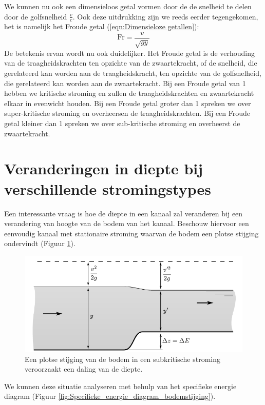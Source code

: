 We kunnen nu ook een dimensieloos getal vormen door de de snelheid te delen door de golfsnelheid $\frac{v}{c}$. Ook deze uitdrukking zijn we reeds eerder tegengekomen, het is namelijk het Froude getal (\ref{eqn:Dimensieloze getallen}):
\begin{equation}
	\text{Fr} = \dfrac{v}{\sqrt{g y}}
\end{equation}
De betekenis ervan wordt nu ook duidelijker. Het Froude getal is de verhouding van de traagheidskrachten ten opzichte van de zwaartekracht, of de snelheid, die gerelateerd kan worden aan de traagheidskracht, ten opzichte van de golfsnelheid, die gerelateerd kan worden aan de zwaartekracht. Bij een Froude getal van 1 hebben we kritische stroming en zullen de traagheidskrachten en zwaartekracht elkaar in evenwicht houden. Bij een Froude getal groter dan 1 spreken we over super-kritische stroming en overheersen de traagheidskrachten. Bij een Froude getal kleiner dan 1 spreken we over sub-kritische stroming en overheerst de zwaartekracht.

	\section{Veranderingen in diepte bij verschillende stromingstypes}
Een interessante vraag is hoe de diepte in een kanaal zal veranderen bij een verandering van hoogte van de bodem van het kanaal. Beschouw hiervoor een eenvoudig kanaal met stationaire stroming waarvan de bodem een plotse stijging ondervindt (Figuur \ref{fig:Open_kanaal_bodemstijging_subkritisch}). 
\begin{figure}[htb]
	\centering
	\includegraphics{fig/kanaalstroming/Open_kanaal_bodemstijging_subkritisch}
	\caption{Een plotse stijging van de bodem in een subkritische stroming veroorzaakt een daling van de diepte.}
	\label{fig:Open_kanaal_bodemstijging_subkritisch}
\end{figure}
We kunnen deze situatie analyseren met behulp van het specifieke energie diagram (Figuur \ref{fig:Specifieke_energie_diagram_bodemstijging}).

